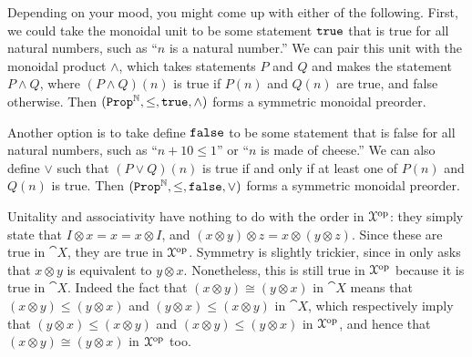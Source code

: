 \documentclass[7Sketches]{subfiles}
\begin{document}
{
Depending on your mood, you might come up with either of the following. First,
we could take the monoidal unit to be some statement $\mathtt{true}$ that is true for
all natural numbers, such as ``$n$ is a natural number.'' We can pair this unit with
the monoidal product $\wedge$, which takes statements $P$ and $Q$
and makes the statement $P\wedge Q$, where $(P\wedge Q)(n)$ is true if $P(n)$
and $Q(n)$ are true, and false otherwise. Then $(\mathtt{Prop}^{\mathbb{N}},\leq,\mathtt{true},\wedge)$
forms a symmetric monoidal preorder.

Another option is to take define $\mathtt{false}$ to be some statement that is false for
all natural numbers, such as ``$n+10 \leq 1$'' or ``$n$ is made of cheese.'' We
can also define $\vee$ such that $(P\vee Q)(n)$ is true if and only if at least
one of $P(n)$ and $Q(n)$ is true. Then $(\mathtt{Prop}^{\mathbb{N}},\leq,\mathtt{false},\vee)$ forms a
symmetric monoidal preorder.
}

{
Unitality and associativity have nothing to do with the order in $\mathcal{X}^{\textnormal{op}}$:
they simply state that $I \otimes x = x = x \otimes I$, and $(x \otimes y)
\otimes z = x \otimes (y \otimes z)$. Since these are true in $\cat{X}$, they
are true in $\mathcal{X}^{\textnormal{op}}$. Symmetry is slightly trickier, since in only asks that
$x \otimes y$ is equivalent to $y \otimes x$. Nonetheless, this is still true in
$\mathcal{X}^{\textnormal{op}}$ because it is true in $\cat{X}$. Indeed the fact that $(x \otimes
y) \cong (y \otimes x)$ in $\cat{X}$ means that $(x \otimes y) \leq (y \otimes
x)$ and $(y \otimes x) \leq (x \otimes y)$ in $\cat{X}$, which respectively
imply that $(y \otimes x) \leq (x \otimes y)$ and $(x \otimes y) \leq (y \otimes
x)$ in $\mathcal{X}^{\textnormal{op}}$, and hence that $(x \otimes y) \cong (y \otimes x)$ in
$\mathcal{X}^{\textnormal{op}}$ too.  
}
\end{document}
